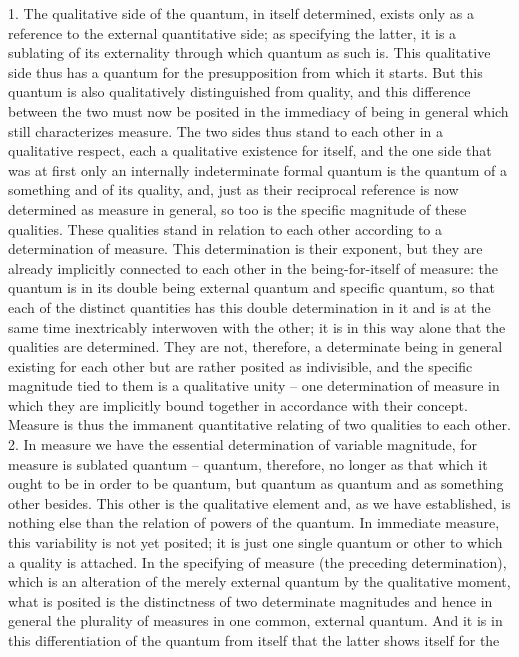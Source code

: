 1. The qualitative side of the quantum, in itself determined, exists only
as a reference to the external quantitative side; as specifying the latter, it
is a sublating of its externality through which quantum as such is. This
qualitative side thus has a quantum for the presupposition from which it
starts. But this quantum is also qualitatively distinguished from quality,
and this difference between the two must now be posited in the immediacy
of being in general which still characterizes measure. The two sides thus
stand to each other in a qualitative respect, each a qualitative existence for
itself, and the one side that was at first only an internally indeterminate
formal quantum is the quantum of a something and of its quality, and,
just as their reciprocal reference is now determined as measure in general,
so too is the specific magnitude of these qualities. These qualities stand
in relation to each other according to a determination of measure. This
determination is their exponent, but they are already implicitly connected
to each other in the being-for-itself of measure: the quantum is in its double
being external quantum and specific quantum, so that each of the distinct
quantities has this double determination in it and is at the same time
inextricably interwoven with the other; it is in this way alone that the
qualities are determined. They are not, therefore, a determinate being in
general existing for each other but are rather posited as indivisible, and the
specific magnitude tied to them is a qualitative unity – one determination
of measure in which they are implicitly bound together in accordance with
their concept. Measure is thus the immanent quantitative relating of two
qualities to each other.
2. In measure we have the essential determination of variable magnitude,
for measure is sublated quantum – quantum, therefore, no longer as that
which it ought to be in order to be quantum, but quantum as quantum
and as something other besides. This other is the qualitative element and,
as we have established, is nothing else than the relation of powers of the
quantum. In immediate measure, this variability is not yet posited; it
is just one single quantum or other to which a quality is attached. In the
specifying of measure (the preceding determination), which is an alteration
of the merely external quantum by the qualitative moment, what is posited
is the distinctness of two determinate magnitudes and hence in general the
plurality of measures in one common, external quantum. And it is in this
differentiation of the quantum from itself that the latter shows itself for the
